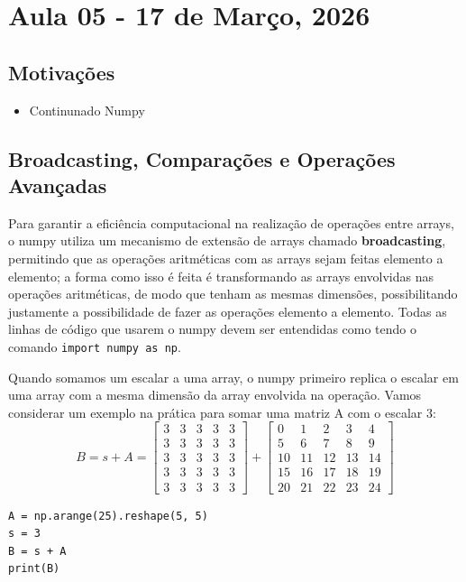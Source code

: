 \documentclass[../numerical_methods.tex]{subfiles}
\begin{document}
\section{Aula 05 - 17 de Março, 2026}
\subsection{Motivações}
\begin{itemize}
	\item Continunado Numpy
\end{itemize}
\subsection{Broadcasting, Comparações e Operações Avançadas}
Para garantir a eficiência computacional na realização de operações entre arrays, o numpy utiliza um mecanismo de extensão de arrays chamado \textbf{broadcasting}, permitindo que as operações aritméticas com as arrays sejam feitas elemento a elemento; a forma como isso é feita é transformando as arrays envolvidas nas operações aritméticas, de modo que tenham as mesmas dimensões, possibilitando justamente a possibilidade de fazer as operações elemento a elemento.
Todas as linhas de código que usarem o numpy devem ser entendidas como tendo o comando \texttt{import numpy as np}.

Quando somamos um escalar a uma array, o numpy primeiro replica o escalar em uma array com a mesma dimensão da array envolvida na operação. Vamos considerar um exemplo na prática para somar uma matriz A com o escalar 3:
\[
	B = s+A = \begin{bmatrix}
		3 & 3 & 3 & 3 & 3 \\
		3 & 3 & 3 & 3 & 3 \\
		3 & 3 & 3 & 3 & 3 \\
		3 & 3 & 3 & 3 & 3 \\
		3 & 3 & 3 & 3 & 3
	\end{bmatrix} + \begin{bmatrix}
		0  & 1  & 2  & 3  & 4  \\
		5  & 6  & 7  & 8  & 9  \\
		10 & 11 & 12 & 13 & 14 \\
		15 & 16 & 17 & 18 & 19 \\
		20 & 21 & 22 & 23 & 24
	\end{bmatrix}
\]
\begin{verbatim}
A = np.arange(25).reshape(5, 5)
s = 3 
B = s + A 
print(B)
\end{verbatim}
\end{document}
